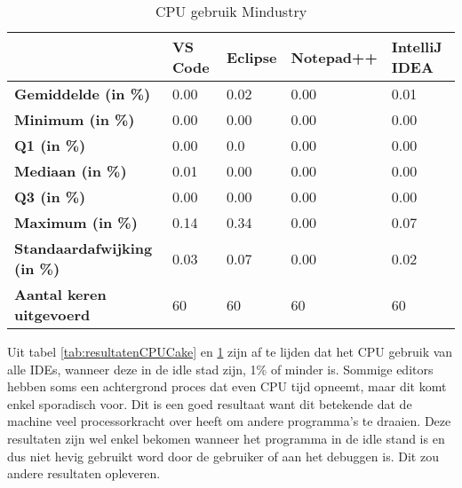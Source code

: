 \begin{table}[h]
	\centering
	\begin{tabular}{ l l l l l }
		\hline
		                                    & \textbf{VS Code} & \textbf{Eclipse} & \textbf{Notepad++} & \textbf{IntelliJ IDEA} \\
		\hline
		\textbf{Gemiddelde (in \%)}         & 0.00             & 0.02             & 0.00               & 0.01                   \\[1ex]

		\textbf{Minimum (in \%) }           & 0.00             & 0.00             & 0.00               & 0.00                   \\
		\textbf{Q1 (in \%)}                 & 0.00             & 0.0              & 0.00               & 0.00                   \\
		\textbf{Mediaan (in \%)}            & 0.01             & 0.00             & 0.00               & 0.00                   \\
		\textbf{Q3 (in \%)}                 & 0.00             & 0.00             & 0.00               & 0.00                   \\
		\textbf{Maximum (in \%)}            & 0.14             & 0.34             & 0.00               & 0.07                   \\[1ex]

		\textbf{Standaardafwijking (in \%)} & 0.03             & 0.07             & 0.00               & 0.02                   \\
		\textbf{Aantal keren uitgevoerd}    & 60               & 60               & 60                 & 60                     \\
		\hline
	\end{tabular}
	\caption{CPU gebruik Mindustry}
	\label{tab:resultatenCPUMindustry}
\end{table}

Uit tabel \ref{tab:resultatenCPUCake} en \ref{tab:resultatenCPUMindustry} zijn af te lijden dat het CPU gebruik van alle IDEs, wanneer deze in de idle stad zijn, 1\% of minder is. Sommige editors hebben soms een achtergrond proces dat even CPU tijd opneemt, maar dit komt enkel sporadisch voor. Dit is een goed resultaat want dit betekende dat de machine veel processorkracht over heeft om andere programma's te draaien.
Deze resultaten zijn wel enkel bekomen wanneer het programma in de idle stand is en dus niet hevig gebruikt word door de gebruiker of aan het debuggen is. Dit zou andere resultaten opleveren.

